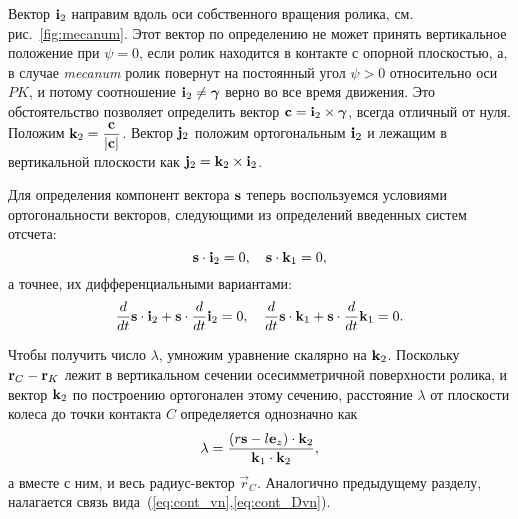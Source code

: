 Вектор ${\bf i}_2$ направим вдоль оси собственного вращения ролика, см. рис.~\ref{fig:mecanum}. Этот вектор по определению не может принять вертикальное положение при $\psi = 0$, если ролик находится в контакте с опорной плоскостью, а, в случае \textit{mecanum} ролик повернут на постоянный угол $\psi > 0$ относительно оси $PK$, и потому соотношение ${\bf i}_2 \ne \vec{\gamma}$ верно во все время движения. Это обстоятельство позволяет определить вектор ${\bf c} = {\bf i}_2 \times \vec{\gamma}$, всегда отличный от нуля. Положим ${\bf k}_2 = \ddfrac{\vec{c}}{|\vec{c}|}$. Вектор ${\bf j}_2$ положим ортогональным ${\bf i}_2$ и лежащим в вертикальной плоскости как ${\bf j}_2 = {\bf k}_2 \times {\bf i}_2$.

Для определения компонент вектора $\vecrho$ теперь воспользуемся условиями ортогональности векторов, следующими из определений введенных систем отсчета:
$$
    \vecrho \cdot {\bf i}_2 = 0, \quad \vecrho \cdot {\bf k}_1 = 0,
$$
а точнее, их дифференциальными вариантами:
$$
    \dfrac{d}{dt} \vecrho \cdot {\bf i}_2 + \vecrho \cdot \dfrac{d}{dt} {\bf i}_2 = 0, \quad
    \dfrac{d}{dt} \vecrho \cdot {\bf k}_1 + \vecrho \cdot \dfrac{d}{dt} {\bf k}_1 = 0.
$$

Чтобы получить число $\lambda$, умножим уравнение скалярно на ${\bf k}_2$. Поскольку ${\bf r}_C - {\bf r}_K$ лежит в вертикальном сечении осесимметричной поверхности ролика, и вектор ${\bf k}_2$ по построению ортогонален этому сечению, расстояние $\lambda$ от плоскости колеса до точки контакта $C$ определяется однозначно как
$$
    \lambda = \ddfrac
        { \left( r\vec{s} - l\vec{e}_z \right) \cdot \vec{k}_2 }
        { \vec{k}_1 \cdot \vec{k}_2 },
$$
а вместе с ним, и весь радиус-вектор $\vec{r}_C$. Аналогично предыдущему разделу, налагается связь вида~(\ref{eq:cont_vn},\ref{eq:cont_Dvn}).

